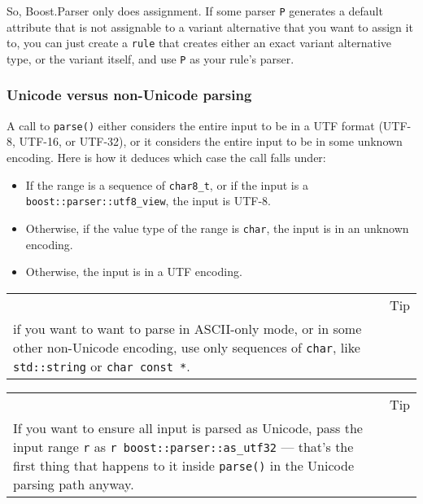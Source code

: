 So, Boost.Parser only does assignment. If some parser \texttt{P} generates a default attribute that is not assignable to a variant alternative that you want to assign it to, you can just create a \texttt{rule} that creates either an exact variant alternative type, or the variant itself, and use \texttt{P} as your rule's parser.

\subsubsection{Unicode versus non-Unicode parsing}

A call to \texttt{parse()} either considers the entire input to be in a UTF format (UTF-8, UTF-16, or UTF-32), or it considers the entire input to be in some unknown encoding. Here is how it deduces which case the call falls under:

\begin{itemize}
\item
  If the range is a sequence of \texttt{char8\_t}, or if the input is a \texttt{boost::parser::utf8\_view}, the input is UTF-8.
\item
  Otherwise, if the value type of the range is \texttt{char}, the input is in an unknown encoding.
\item
  Otherwise, the input is in a UTF encoding.
\end{itemize}

\begin{longtable}[]{@{}
  >{\raggedright\arraybackslash}p{}
  >{\raggedright\arraybackslash}p{}@{}}
\toprule\noalign{}
\endhead
\bottomrule\noalign{}
\endlastfoot
\begin{minipage}[t]{\linewidth}\raggedright
\end{minipage} & Tip \\
if you want to want to parse in ASCII-only mode, or in some other non-Unicode encoding, use only sequences of \texttt{char}, like \texttt{std::string} or \texttt{char const *}. & \\
\end{longtable}

\begin{longtable}[]{@{}
  >{\raggedright\arraybackslash}p{}
  >{\raggedright\arraybackslash}p{}@{}}
\toprule\noalign{}
\endhead
\bottomrule\noalign{}
\endlastfoot
\begin{minipage}[t]{\linewidth}\raggedright
\end{minipage} & Tip \\
If you want to ensure all input is parsed as Unicode, pass the input range \texttt{r} as \texttt{r \textbar{} boost::parser::as\_utf32} --- that's the first thing that happens to it inside \texttt{parse()} in the Unicode parsing path anyway. & \\
\end{longtable}

